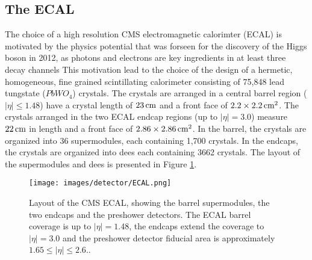 \subsection{The ECAL}
The choice of a high resolution CMS electromagnetic calorimter (ECAL) is motivated by the physics potential that was forseen for the discovery of the Higgs boson in 2012, as photons and electrons are key ingredients in at least three decay channels\cite{Cockerill:2008td}
This motivation lead to the choice of the design of a hermetic, homogeneous, fine grained scintillating calorimeter consisting of 75,848 lead tungstate ($PbWO_{4}$) crystals. 
The crystals are arranged in a central barrel region ($|\eta|\leq1.48$) have a crystal length of $23\,\text{cm}$ and a front face of $2.2\times2.2\,\text{cm}^{2}$. 
The crystals arranged in the two ECAL endcap regions (up to $|\eta|=3.0$) measure $22\,\text{cm}$ in length and a front face of $2.86\times2.86\,\text{cm}^{2}$. 
In the barrel, the crystals are organized into 36 supermodules, each containing 1,700 crystals. 
In the endcaps, the crystals are organized into dees each containing 3662 crystals. 
The layout of the supermodules and dees is presented in Figure \ref{fig:ECAL}. 
\begin{figure}[!htp]
  \centering
   \texttt{[image: images/detector/ECAL.png]}
   \caption{Layout of the CMS ECAL, showing the barrel supermodules, the two endcaps and the preshower detectors. The ECAL barrel coverage is up to $|\eta|=1.48$, the endcaps extend the coverage to $|\eta|=3.0$ and the preshower detector fiducial area is approximately $1.65\leq|\eta|\leq2.6$.\cite{Chatrchyan:2013dga}.}
   \label{fig:ECAL}
\end{figure}                                                                                            
  
